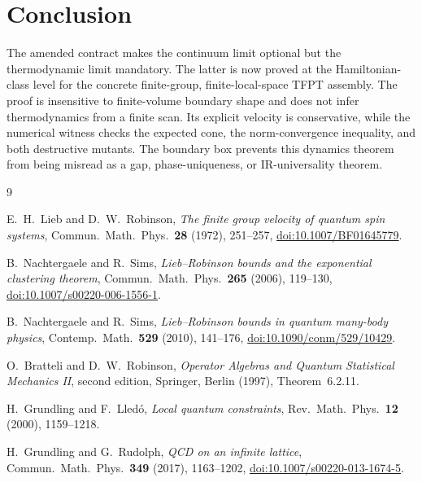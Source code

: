 \section*{Conclusion}

The amended contract makes the continuum limit optional but the
thermodynamic limit mandatory.  The latter is now proved at the
Hamiltonian-class level for the concrete finite-group, finite-local-space
TFPT assembly.  The proof is insensitive to finite-volume boundary shape
and does not infer thermodynamics from a finite scan.  Its explicit
velocity is conservative, while the numerical witness checks the expected
cone, the norm-convergence inequality, and both destructive mutants.
The boundary box prevents this dynamics theorem from being misread as a
gap, phase-uniqueness, or IR-universality theorem.

\begin{thebibliography}{9}

E.~H.~Lieb and D.~W.~Robinson,
\emph{The finite group velocity of quantum spin systems},
Commun.\ Math.\ Phys.\ \textbf{28} (1972), 251--257,
\href{https://doi.org/10.1007/BF01645779}
{doi:10.1007/BF01645779}.

B.~Nachtergaele and R.~Sims,
\emph{Lieb--Robinson bounds and the exponential clustering theorem},
Commun.\ Math.\ Phys.\ \textbf{265} (2006), 119--130,
\href{https://doi.org/10.1007/s00220-006-1556-1}
{doi:10.1007/s00220-006-1556-1}.

B.~Nachtergaele and R.~Sims,
\emph{Lieb--Robinson bounds in quantum many-body physics},
Contemp.\ Math.\ \textbf{529} (2010), 141--176,
\href{https://doi.org/10.1090/conm/529/10429}
{doi:10.1090/conm/529/10429}.

O.~Bratteli and D.~W.~Robinson,
\emph{Operator Algebras and Quantum Statistical Mechanics II},
second edition, Springer, Berlin (1997), Theorem~6.2.11.

H.~Grundling and F.~Lled\'o,
\emph{Local quantum constraints},
Rev.\ Math.\ Phys.\ \textbf{12} (2000), 1159--1218.

H.~Grundling and G.~Rudolph,
\emph{QCD on an infinite lattice},
Commun.\ Math.\ Phys.\ \textbf{349} (2017), 1163--1202,
\href{https://doi.org/10.1007/s00220-013-1674-5}
{doi:10.1007/s00220-013-1674-5}.

\end{thebibliography}


